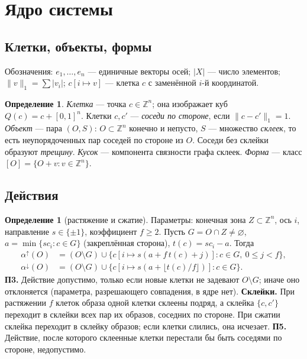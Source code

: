 \documentclass[11pt,a4paper]{article}
\theoremstyle{plain}
\theoremstyle{definition}
\newtheorem{definition}[theorem]{Определение}
\theoremstyle{remark}
\newcommand{\Z}{\mathbb{Z}}
\begin{document}
\section{Ядро системы}\label{sec:core}

\subsection{Клетки, объекты, формы}

Обозначения: $e_1,\dots,e_n$ — единичные векторы осей; $|X|$ — число элементов; $\|v\|_1=\sum|v_i|$; $c[i\mapsto v]$ — клетка $c$ с заменённой $i$-й координатой.

\begin{definition}
\emph{Клетка} — точка $c\in\Z^n$; она изображает куб $Q(c)=c+[0,1]^n$. Клетки $c,c'$ — \emph{соседи по стороне}, если $\|c-c'\|_1=1$. \emph{Объект} — пара $(O,S)$: $O\subset\Z^n$ конечно и непусто, $S$ — множество \emph{склеек}, то есть неупорядоченных пар соседей по стороне из $O$. Соседи без склейки образуют \emph{трещину}. \emph{Кусок} — компонента связности графа склеек. \emph{Форма} — класс $[O]=\{O+v: v\in\Z^n\}$.
\end{definition}

\subsection{Действия}\label{sec:actions}

\begin{definition}[растяжение и сжатие]\label{def:alpha}
Параметры: конечная зона $Z\subset\Z^n$, ось $i$, направление $s\in\{\pm1\}$, коэффициент $f\ge2$. Пусть $G=O\cap Z\ne\varnothing$, $a=\min\{sc_i:c\in G\}$ (закреплённая сторона), $t(c)=sc_i-a$. Тогда
\begin{align*}
\alpha^{\uparrow}(O)&=(O\setminus G)\cup\{c[i\mapsto s(a+f\,t(c)+j)]: c\in G,\ 0\le j<f\},\\
\alpha^{\downarrow}(O)&=(O\setminus G)\cup\{c[i\mapsto s(a+\lfloor t(c)/f\rfloor)]: c\in G\}.
\end{align*}
\textbf{П3.} Действие допустимо, только если новые клетки не задевают $O\setminus G$; иначе оно отклоняется (параметра, разрешающего совпадения, в ядре нет).
\textbf{Склейки.} При растяжении $f$ клеток образа одной клетки склеены подряд, а склейка $\{c,c'\}$ переходит в склейки всех пар их образов, соседних по стороне. При сжатии склейка переходит в склейку образов; если клетки слились, она исчезает.
\textbf{П5.} Действие, после которого склеенные клетки перестали бы быть соседями по стороне, недопустимо.
\end{definition}
\end{document}
